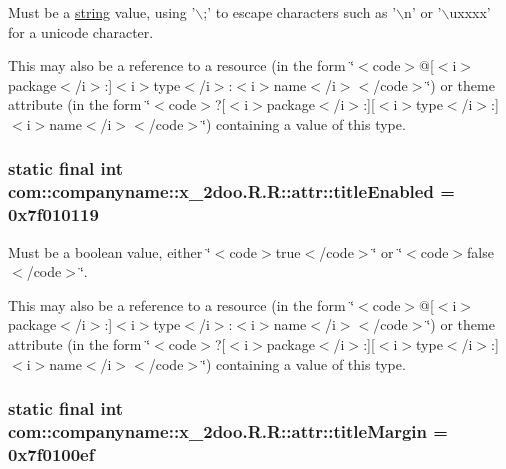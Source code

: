 Must be a \hyperlink{classcom_1_1companyname_1_1x__2doo_1_1_r_1_1string}{string} value, using '$\backslash$;' to escape characters such as '$\backslash$n' or '$\backslash$uxxxx' for a unicode character. 

This may also be a reference to a resource (in the form \char`\"{}$<$code$>$@\mbox{[}$<$i$>$package$<$/i$>$:\mbox{]}$<$i$>$type$<$/i$>$:$<$i$>$name$<$/i$>$$<$/code$>$\char`\"{}) or theme attribute (in the form \char`\"{}$<$code$>$?\mbox{[}$<$i$>$package$<$/i$>$:\mbox{]}\mbox{[}$<$i$>$type$<$/i$>$:\mbox{]}$<$i$>$name$<$/i$>$$<$/code$>$\char`\"{}) containing a value of this type. \hypertarget{classcom_1_1companyname_1_1x__2doo_1_1_r_1_1attr_9e3b3c0bb26eb0c922eff68cc77593b9}{
\subsubsection[{titleEnabled}]{\setlength{\rightskip}{0pt plus 5cm}static final int com::companyname::x\_\-2doo.R.R::attr::titleEnabled = 0x7f010119}}
\label{classcom_1_1companyname_1_1x__2doo_1_1_r_1_1attr_9e3b3c0bb26eb0c922eff68cc77593b9}


Must be a boolean value, either \char`\"{}$<$code$>$true$<$/code$>$\char`\"{} or \char`\"{}$<$code$>$false$<$/code$>$\char`\"{}. 

This may also be a reference to a resource (in the form \char`\"{}$<$code$>$@\mbox{[}$<$i$>$package$<$/i$>$:\mbox{]}$<$i$>$type$<$/i$>$:$<$i$>$name$<$/i$>$$<$/code$>$\char`\"{}) or theme attribute (in the form \char`\"{}$<$code$>$?\mbox{[}$<$i$>$package$<$/i$>$:\mbox{]}\mbox{[}$<$i$>$type$<$/i$>$:\mbox{]}$<$i$>$name$<$/i$>$$<$/code$>$\char`\"{}) containing a value of this type. \hypertarget{classcom_1_1companyname_1_1x__2doo_1_1_r_1_1attr_3b6c3eb95c01aad475eb671f3df86055}{
\subsubsection[{titleMargin}]{\setlength{\rightskip}{0pt plus 5cm}static final int com::companyname::x\_\-2doo.R.R::attr::titleMargin = 0x7f0100ef}}
\label{classcom_1_1companyname_1_1x__2doo_1_1_r_1_1attr_3b6c3eb95c01aad475eb671f3df86055}


